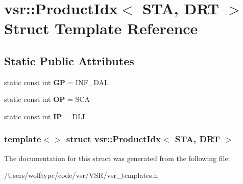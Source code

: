 \hypertarget{structvsr_1_1_product_idx_3_01_s_t_a_00_01_d_r_t_01_4}{\section{vsr\-:\-:Product\-Idx$<$ S\-T\-A, D\-R\-T $>$ Struct Template Reference}
\label{structvsr_1_1_product_idx_3_01_s_t_a_00_01_d_r_t_01_4}
}
\subsection*{Static Public Attributes}
\begin{DoxyCompactItemize}
\item 
\hypertarget{structvsr_1_1_product_idx_3_01_s_t_a_00_01_d_r_t_01_4_a3c84b0c56bd4e5f3444cf7b501612333}{static const int {\bfseries G\-P} = I\-N\-F\-\_\-\-D\-A\-L}\label{structvsr_1_1_product_idx_3_01_s_t_a_00_01_d_r_t_01_4_a3c84b0c56bd4e5f3444cf7b501612333}

\item 
\hypertarget{structvsr_1_1_product_idx_3_01_s_t_a_00_01_d_r_t_01_4_a39d0773bb66da145dd978e1533084c20}{static const int {\bfseries O\-P} = S\-C\-A}\label{structvsr_1_1_product_idx_3_01_s_t_a_00_01_d_r_t_01_4_a39d0773bb66da145dd978e1533084c20}

\item 
\hypertarget{structvsr_1_1_product_idx_3_01_s_t_a_00_01_d_r_t_01_4_ace036b368c197b859adeffea40a9c599}{static const int {\bfseries I\-P} = D\-L\-L}\label{structvsr_1_1_product_idx_3_01_s_t_a_00_01_d_r_t_01_4_ace036b368c197b859adeffea40a9c599}

\end{DoxyCompactItemize}
\subsubsection*{template$<$$>$ struct vsr\-::\-Product\-Idx$<$ S\-T\-A, D\-R\-T $>$}



The documentation for this struct was generated from the following file\-:\begin{DoxyCompactItemize}
\item 
/\-Users/wolftype/code/vsr/\-V\-S\-R/vsr\-\_\-templates.\-h\end{DoxyCompactItemize}
